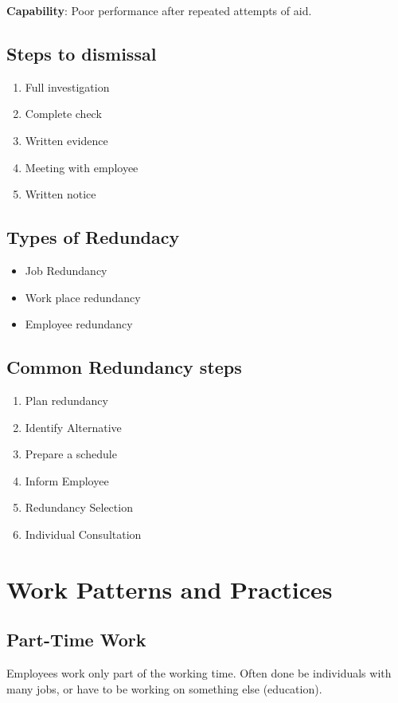 \documentclass{report}
\begin{document}
\textbf{Capability}: Poor performance after repeated attempts of aid.

\subsection{Steps to dismissal}
\begin{enumerate}
	\item Full investigation
	\item Complete check
	\item Written evidence
	\item Meeting with employee
	\item Written notice
\end{enumerate}

\subsection{Types of Redundacy}
\begin{itemize}
	\item Job Redundancy
	\item Work place redundancy
	\item Employee redundancy
\end{itemize}

\subsection{Common Redundancy steps}
\begin{enumerate}
	\item Plan redundancy
	\item Identify Alternative
	\item Prepare a schedule
	\item Inform Employee
	\item Redundancy Selection
	\item Individual Consultation
\end{enumerate}

\section{Work Patterns and Practices}
\subsection{Part-Time Work}
Employees work only part of the working time.
Often done be individuals with many jobs, or have to be working on something else (education).
\end{document}
